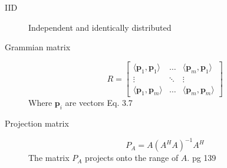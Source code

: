 \documentclass{article}
\begin{document}
\begin{multicols}{2}
\begin{description}
\item [IID]  Independent and identically distributed
\item [Grammian matrix] 
$$R = \begin{bmatrix} \langle \mathbf{p}_1, \mathbf{p}_1 \rangle & \dots & \langle \mathbf{p}_m, \mathbf{p}_1 \rangle \\ \vdots & \ddots & \vdots \\ \langle \mathbf{p}_1, \mathbf{p}_m \rangle & \dots & \langle \mathbf{p}_m, \mathbf{p}_m \rangle \end{bmatrix} $$ 
Where $ \mathbf{p}_i $ are vectors Eq. 3.7
\item [Projection matrix] 
$$P_A = A(A^HA)^{-1}A^H$$ 
The matrix $P_A$ projects onto the range of $A$. pg 139 
\end{description}

\end{multicols}
\end{document}
